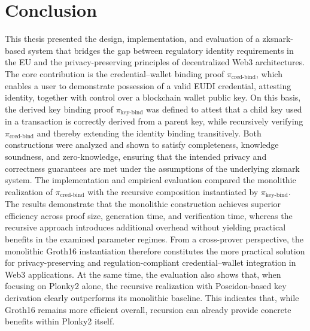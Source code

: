 \chapter{Conclusion}
\label{chap:conclusion}
This thesis presented the design, implementation, and evaluation of a \acrshort{zksnark}-based system that bridges the gap between regulatory identity requirements in the EU and the privacy-preserving principles of decentralized Web3 architectures. The core contribution is the credential–wallet binding proof $\pi_{\text{cred-bind}}$, which enables a user to demonstrate possession of a valid EUDI credential, attesting identity, together with control over a blockchain wallet public key. On this basis, the derived key binding proof $\pi_{\text{key-bind}}$ was defined to attest that a child key used in a transaction is correctly derived from a parent key, while recursively verifying $\pi_{\text{cred-bind}}$ and thereby extending the identity binding transitively. Both constructions were analyzed and shown to satisfy completeness, knowledge soundness, and zero-knowledge, ensuring that the intended privacy and correctness guarantees are met under the assumptions of the underlying \acrshort{zksnark} system. The implementation and empirical evaluation compared the monolithic realization of $\pi_{\text{cred-bind}}$ with the recursive composition instantiated by $\pi_{\text{key-bind}}$. The results demonstrate that the monolithic construction achieves superior efficiency across proof size, generation time, and verification time, whereas the recursive approach introduces additional overhead without yielding practical benefits in the examined parameter regimes. From a cross-prover perspective, the monolithic Groth16 instantiation therefore constitutes the more practical solution for privacy-preserving and regulation-compliant credential–wallet integration in Web3 applications. At the same time, the evaluation also shows that, when focusing on Plonky2 alone, the recursive realization with Poseidon-based key derivation clearly outperforms its monolithic baseline. This indicates that, while Groth16 remains more efficient overall, recursion can already provide concrete benefits within Plonky2 itself.

